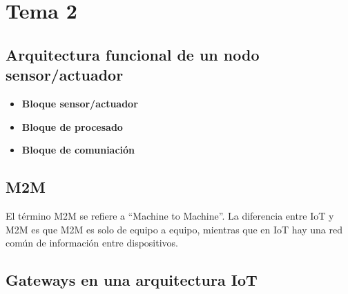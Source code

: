\documentclass[12pt, letterpaper]{article}
\title{\doctitle}
\author{Juan Luis Serradilla Tormos}
\date{\monthname[\month] de \the\year}
\begin{document}
\pagestyle{fancy}

\maketitle

\newpage
\tableofcontents

\newpage

\section{Tema 2}

\subsection{Arquitectura funcional de un nodo sensor/actuador}

\begin{itemize}
    \item \textbf{Bloque sensor/actuador}
    \item \textbf{Bloque de procesado}
    \item \textbf{Bloque de comuniación}
\end{itemize}

\subsection{M2M}
El término M2M se refiere a ``Machine to Machine''. La diferencia entre IoT y M2M es que M2M es solo de equipo a equipo, mientras que en IoT hay una red común de información entre dispositivos.

\subsection{Gateways en una arquitectura IoT}
\end{document}
